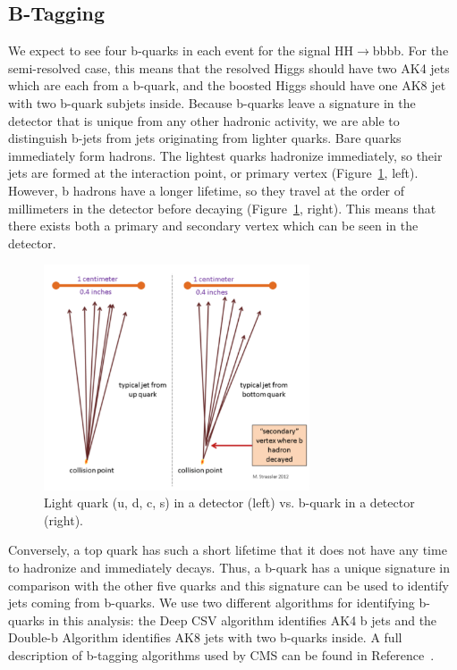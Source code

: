 \subsection{B-Tagging}
We expect to see four b-quarks in each event for the signal HH$\rightarrow$bbbb. For the semi-resolved case, this means that the resolved Higgs should have two AK4 jets which are each from a b-quark, and the boosted Higgs should have one AK8 jet with two b-quark subjets inside. Because b-quarks leave a signature in the detector that is unique from any other hadronic activity, we are able to distinguish b-jets from jets originating from lighter quarks. Bare quarks immediately form hadrons. The lightest quarks hadronize immediately, so their jets are formed at the interaction point, or primary vertex (Figure~\ref{Fig:bjet}, left). However, b hadrons have a longer lifetime, so they travel at the order of millimeters in the detector before decaying (Figure~\ref{Fig:bjet}, right). This means that there exists both a primary and secondary vertex which can be seen in the detector. 
\begin{figure}[h!]
    \centering
        \includegraphics[width=0.7\textwidth]{F4/bquark.png}
        \caption{Light quark (u, d, c, s) in a detector (left) vs. b-quark in a detector (right).}
        \label{Fig:bjet}
\end{figure}
Conversely, a top quark has such a short lifetime that it does not have any time to hadronize and immediately decays. Thus, a b-quark has a unique signature in comparison with the other five quarks and this signature can be used to identify jets coming from b-quarks. We use two different algorithms for identifying b-quarks in this analysis: the Deep CSV algorithm identifies AK4 b jets and the Double-b Algorithm identifies AK8 jets with two b-quarks inside. A full description of b-tagging algorithms used by CMS can be found in Reference~\cite{Sirunyan:2017ezt}.

